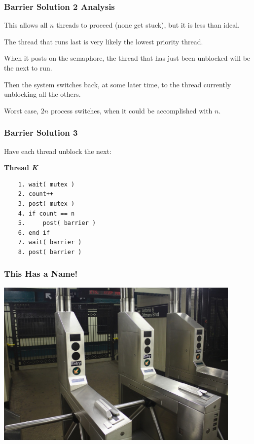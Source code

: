 \begin{frame}
	\frametitle{Barrier Solution 2 Analysis}

	This allows all $n$ threads to proceed (none get stuck), but it is less than ideal.

	The thread that runs last is very likely the lowest priority thread.

	When it posts on the semaphore, the thread that has just been unblocked will be the next to run.

	Then the system switches back, at some later time, to the thread currently unblocking all the others.

	Worst case, $2n$ process switches, when it could be accomplished with $n$.


\end{frame}

\begin{frame}[fragile]
	\frametitle{Barrier Solution 3}

	Have each thread unblock the next:

	\textbf{Thread \textit{K}}\vspace{-6em}
	\begin{verbatim}
	1. wait( mutex )
	2. count++
	3. post( mutex )
	4. if count == n
	5.     post( barrier )
	6. end if
	7. wait( barrier )
	8. post( barrier )
  \end{verbatim}
	\vspace{-2em}


\end{frame}


\begin{frame}
	\frametitle{This Has a Name!}
	\begin{center}
		\includegraphics[width=0.9\textwidth]{images/nyc-subway-turnstile.jpg}
	\end{center}

\end{frame}



